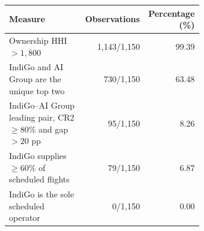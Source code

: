 \begin{tabular}{@{}>{\raggedright\arraybackslash}p{0.64\linewidth}rr@{}}
\toprule
Measure & Observations & Percentage (\%) \\
\midrule
Ownership HHI $>1{,}800$ & 1,143/1,150 & 99.39 \\
IndiGo and AI Group are the unique top two & 730/1,150 & 63.48 \\
IndiGo--AI Group leading pair, CR2 $\geq80\%$ and gap $>20$ pp & 95/1,150 & 8.26 \\
IndiGo supplies $\geq60\%$ of scheduled flights & 79/1,150 & 6.87 \\
IndiGo is the sole scheduled operator & 0/1,150 & 0.00 \\
\bottomrule
\end{tabular}
